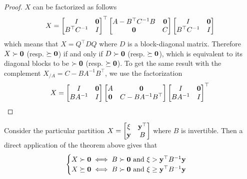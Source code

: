 \begin{proof}
    $X$ can be factorized as follows
    \begin{equation*}
        X = \begin{bmatrix}
            I & \mathbf{0}\\
            B^\top C^{-1} & I
        \end{bmatrix}^\top
        \begin{bmatrix}
            A - B^\top C^{-1}B & \mathbf{0}\\
            \mathbf{0} & C
        \end{bmatrix}
        \begin{bmatrix}
            I & \mathbf{0}\\
            B^\top C^{-1} & I
        \end{bmatrix}
    \end{equation*}
    which means that $X = Q^\top D Q$ where $D$ is a block-diagonal matrix.
    Therefore $X \succ \mathbf{0}$ (resp. $\succeq \mathbf{0}$) if and only if $D \succ \mathbf{0}$ (resp. $\succeq \mathbf{0}$),
    which is equivalent to its diagonal blocks to be $\succ \mathbf{0}$ (resp. $\succeq \mathbf{0}$).
    To get the same result with the complement $X_{/A} = C - B A^{-1} B^\top$,
    we use the factorization
    \begin{equation*}
        X = \begin{bmatrix}
            I & \mathbf{0}\\
            BA^{-1} & I
        \end{bmatrix}
        \begin{bmatrix}
            A & \mathbf{0}\\
            \mathbf{0} & C - BA^{-1}B^\top
        \end{bmatrix}
        \begin{bmatrix}
            I & \mathbf{0}\\
            BA^{-1} & I
        \end{bmatrix}^\top
    \end{equation*}
\end{proof}

Consider the particular partition
$X = \begin{bmatrix}
    \xi & \mathbf{y}^\top\\
    \mathbf{y} & B
\end{bmatrix}$
where $B$ is invertible.
Then a direct application of the theorem above gives that
\begin{equation*}
    \begin{cases}
        X \succ \mathbf{0} \iff B \succ \mathbf{0} \text{ and } \xi > \mathbf{y}^\top B^{-1} \mathbf{y}\\
        X \succeq \mathbf{0} \iff B \succ \mathbf{0} \text{ and } \xi \geq \mathbf{y}^\top B^{-1} \mathbf{y}
    \end{cases}
\end{equation*}

